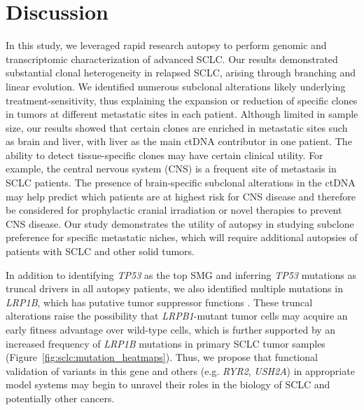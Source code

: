 \section{Discussion}
In this study, we leveraged rapid research autopsy to perform genomic and transcriptomic characterization of advanced SCLC\@. Our results demonstrated substantial clonal heterogeneity in relapsed SCLC, arising through branching and linear evolution. We identified numerous subclonal alterations likely underlying treatment-sensitivity, thus explaining the expansion or reduction of specific clones in tumors at different metastatic sites in each patient. Although limited in sample size, our results showed that certain clones are enriched in metastatic sites such as brain and liver, with liver as the main ctDNA contributor in one patient. The ability to detect tissue-specific clones may have certain clinical utility. For example, the central nervous system (CNS) is a frequent site of metastasis in SCLC patients. The presence of brain-specific subclonal alterations in the ctDNA may help predict which patients are at highest risk for CNS disease and therefore be considered for prophylactic cranial irradiation or novel therapies to prevent CNS disease. Our study demonstrates the utility of autopsy in studying subclone preference for specific metastatic niches, which will require additional autopsies of patients with SCLC and other solid tumors.

In addition to identifying \textit{TP53} as the top SMG and inferring \textit{TP53} mutations as truncal drivers in all autopsy patients, we also identified multiple mutations in \textit{LRP1B}, which has putative tumor suppressor functions \cite{beer2016,prazeres2011,wang2017}. These truncal alterations raise the possibility that \textit{LRPB1}-mutant tumor cells may acquire an early fitness advantage over wild-type cells, which is further supported by an increased frequency of \textit{LRP1B} mutations in primary SCLC tumor samples (Figure~\ref{fig:sclc:mutation_heatmaps}). Thus, we propose that functional validation of variants in this gene and others (e.g. \textit{RYR2}, \textit{USH2A}) in appropriate model systems may begin to unravel their roles in the biology of SCLC and potentially other cancers.

